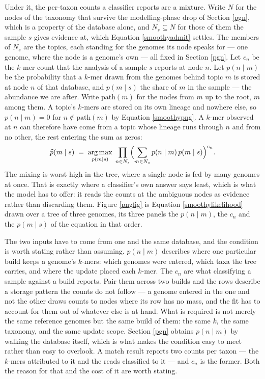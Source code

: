\documentclass[pdflatex,sn-vancouver-num]{sn-jnl}
\DeclareMathOperator*{\argmax}{arg\,max}
\begin{document}
    Under it, the per-taxon counts a classifier reports are a mixture. Write $N$ for the nodes of the
    taxonomy that survive the modelling-phase drop of Section \ref{pgn}, which is a property of the
    database alone, and $N_s \subseteq N$ for those of them the sample $s$ gives evidence at, which
    Equation \eqref{smoothyadmit} settles. The members of $N_s$ are the topics, each standing for the
    genomes its node speaks for --- one genome, where the node is a genome's own --- all fixed in
    Section \ref{pgn}. Let $c_n$ be the $k$-mer count that the analysis of a sample $s$ reports at
    node $n$. Let $p(n \mid m)$ be the
    probability that a $k$-mer drawn from the genomes behind topic $m$ is stored at node $n$ of that
    database, and $p(m \mid s)$ the share of $m$ in the sample --- the abundance we are after. Write
    $\mathrm{path}(m)$ for the nodes from $m$ up to the root, $m$ among them. A topic's $k$-mers are
    stored on its own lineage and nowhere else, so $p(n \mid m) = 0$ for $n \notin \mathrm{path}(m)$
    by Equation \eqref{smoothypng}. A $k$-mer observed at $n$ can therefore have come from a topic
    whose lineage runs through $n$ and from no other, the rest entering the sum as zeros:
    \begin{equation}\label{smoothylikelihood}
        \widehat{p}(m \mid s) \;=\; \argmax_{p(m \mid s)} \;\prod_{n \in N_s}
            \Bigl( \sum_{m \in N_s} p(n \mid m)\, p(m \mid s) \Bigr)^{c_n}.
    \end{equation}
    The mixing is worst high in the tree, where a single node is fed by many genomes at once. That is
    exactly where a classifier's own answer says least, which is what the model has to offer: it
    reads the counts at the ambiguous nodes as evidence rather than discarding them. Figure \ref{pngfig} is
    Equation \eqref{smoothylikelihood} drawn over a tree of three genomes, its three panels the
    $p(n \mid m)$, the $c_n$ and the $p(m \mid s)$ of the equation in that order.

    The two inputs have to come from one and the same database, and the condition is worth stating
    rather than assuming. $p(n \mid m)$ describes where one particular build keeps a genome's
    $k$-mers: which genomes were entered, which taxa the tree carries, and where the update placed
    each $k$-mer. The $c_n$ are what classifying a sample against a build reports. Pair them across
    two builds and the rows describe a storage pattern the counts do not follow --- a genome entered
    in the one and not the other draws counts to nodes where its row has no mass, and the fit has to
    account for them out of whatever else is at hand. What is required is not merely the same
    reference genomes but the same build of them: the same $k$, the same taxonomy, and the same
    update scope. Section \ref{pgn} obtains $p(n \mid m)$ by walking the database itself, which is
    what makes the condition easy to meet rather than easy to overlook.
    A match result reports two counts per taxon --- the $k$-mers attributed to it and the reads
    classified to it --- and $c_n$ is the former. Both the reason for that and the cost of it are
    worth stating.
\end{document}
